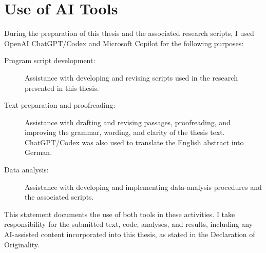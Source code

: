 \chapter{Use of AI Tools}\label{app:ai-tools}

During the preparation of this thesis and the associated research scripts, I used OpenAI ChatGPT/Codex and Microsoft Copilot for the following purposes:

\begin{description}
    \item[Program script development:] Assistance with developing and revising scripts used in the research presented in this thesis.
    \item[Text preparation and proofreading:] Assistance with drafting and revising passages, proofreading, and improving the grammar, wording, and clarity of the thesis text. ChatGPT/Codex was also used to translate the English abstract into German.
    \item[Data analysis:] Assistance with developing and implementing data-analysis procedures and the associated scripts.
\end{description}

This statement documents the use of both tools in these activities. I take responsibility for the submitted text, code, analyses, and results, including any AI-assisted content incorporated into this thesis, as stated in the Declaration of Originality.
